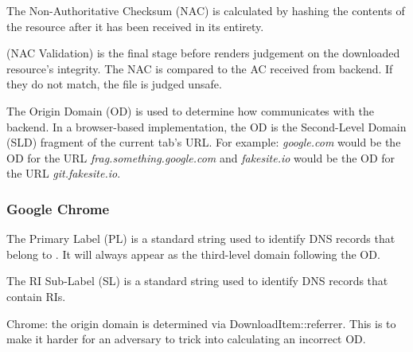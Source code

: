 The Non-Authoritative Checksum (NAC) is calculated by hashing the contents of the
resource after it has been received in its entirety.

 (NAC Validation) is the final stage before
\SYSTEM{} renders judgement on the downloaded resource's integrity. The NAC is
compared to the AC received from backend. If they do not match, the file is
judged unsafe.

The Origin Domain (OD) is used to determine how \SYSTEM{} communicates with the
backend. In a browser-based implementation, the OD is the Second-Level Domain
(SLD) fragment of the current tab's URL. For example:
\emph{google.com} would be the OD for the URL \emph{frag.something.google.com}
and \emph{fakesite.io} would be the OD for the URL \emph{git.fakesite.io}.

\subsubsection{Google Chrome}


The Primary Label (PL) is a standard string used to identify DNS records that
belong to \SYSTEM{}. It will always appear as the third-level domain following the
OD.

The RI Sub-Label (SL) is a standard string used to identify DNS records that
contain RIs.

Chrome: the origin domain is determined via DownloadItem::referrer. This is to
make it harder for an adversary to trick \SYSTEM{} into calculating an incorrect
OD.


